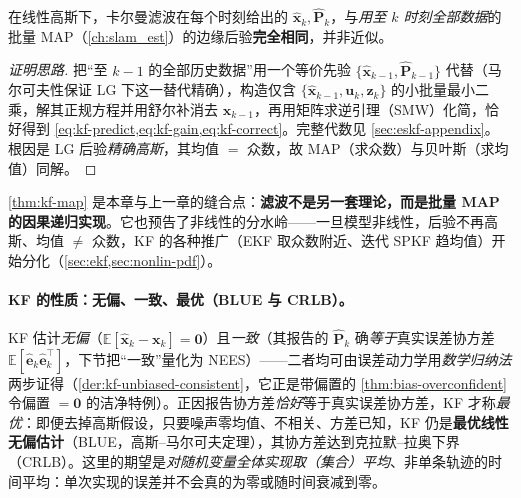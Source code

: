 \begin{theorem}\label{thm:kf-map}
在线性高斯下，卡尔曼滤波在每个时刻给出的 $\hat{\mathbf{x}}_k,\hat{\mathbf{P}}_k$，与\emph{用至 $k$ 时刻全部数据}的批量 MAP（\cref{ch:slam_est}）的边缘后验\textbf{完全相同}，并非近似。
\end{theorem}
\begin{proof}[证明思路]
把“至 $k-1$ 的全部历史数据”用一个等价先验 $\{\hat{\mathbf{x}}_{k-1},\hat{\mathbf{P}}_{k-1}\}$ 代替（马尔可夫性保证 LG 下这一替代精确），构造仅含 $\{\hat{\mathbf{x}}_{k-1},\mathbf{u}_k,\mathbf{z}_k\}$ 的小批量最小二乘，解其正规方程并用舒尔补消去 $\mathbf{x}_{k-1}$，再用矩阵求逆引理（SMW）化简，恰好得到 \cref{eq:kf-predict,eq:kf-gain,eq:kf-correct}。完整代数见 \cref{sec:eskf-appendix}。根因是 LG 后验\emph{精确高斯}，其均值 $=$ 众数，故 MAP（求众数）与贝叶斯（求均值）同解。
\end{proof}

\begin{insight}
\cref{thm:kf-map} 是本章与上一章的缝合点：\textbf{滤波不是另一套理论，而是批量 MAP 的因果递归实现}。它也预告了非线性的分水岭——一旦模型非线性，后验不再高斯、均值 $\neq$ 众数，KF 的各种推广（EKF 取众数附近、迭代 SPKF 趋均值）开始分化（\cref{sec:ekf,sec:nonlin-pdf}）。
\end{insight}

\paragraph{KF 的性质：无偏、一致、最优（BLUE 与 CRLB）。}
KF 估计\emph{无偏}（$\mathbb{E}[\hat{\mathbf{x}}_k-\mathbf{x}_k]=\mathbf{0}$）且\emph{一致}（其报告的 $\hat{\mathbf{P}}_k$ 确\emph{等于}真实误差协方差 $\mathbb{E}[\hat{\mathbf{e}}_k\hat{\mathbf{e}}_k^\top]$，下节把“一致”量化为 NEES）——二者均可由误差动力学用\emph{数学归纳法}两步证得（\cref{der:kf-unbiased-consistent}，它正是带偏置的 \cref{thm:bias-overconfident} 令偏置 $=\mathbf{0}$ 的洁净特例）。正因报告协方差\emph{恰好}等于真实误差协方差，KF 才称\emph{最优}：即便去掉高斯假设，只要噪声零均值、不相关、方差已知，KF 仍是\textbf{最优线性无偏估计}（BLUE，高斯–马尔可夫定理），其协方差达到克拉默–拉奥下界（CRLB）\cite{barfoot2024state}。这里的期望是\emph{对随机变量全体实现取（集合）平均}、非单条轨迹的时间平均：单次实现的误差并不会真的为零或随时间衰减到零。

